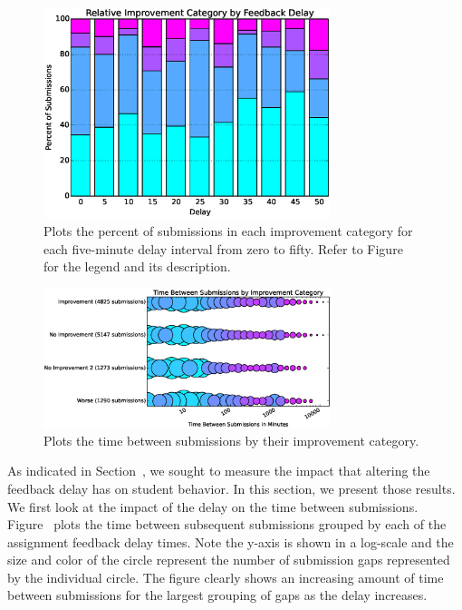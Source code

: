 \begin{figure}[!t]
\centering \includegraphics[width=3.3in]{graphs/Relative_Improvement_Category_by_Feedback_Delay.eps}
\caption{Plots the percent of submissions in each improvement category for each
  five-minute delay interval from zero to fifty. Refer to
  Figure~ for the legend and its description.}
\end{figure}

\begin{figure}[!t]
\centering \includegraphics[width=3.3in]{graphs/Time_Between_Submissions_by_Improvement_Category.eps}
\caption{Plots the time between submissions by their improvement category.}
\end{figure}

As indicated in Section~, we sought to measure the impact
that altering the feedback delay has on student behavior. In this section, we
present those results. We first look at the impact of the delay on the time
between submissions. Figure~ plots the time between
subsequent submissions grouped by each of the assignment feedback delay
times. Note the y-axis is shown in a log-scale and the size and color of the
circle represent the number of submission gaps represented by the individual
circle. The figure clearly shows an increasing amount of time between
submissions for the largest grouping of gaps as the delay increases.

